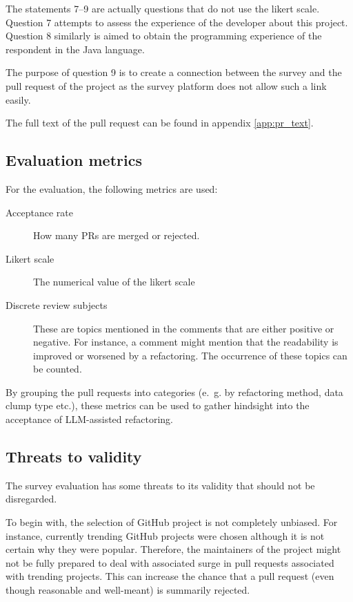 The statements 7--9 are actually questions that do not use the likert scale. Question 7 attempts to assess the experience of the developer about this project. Question 8 similarly is aimed to obtain the programming experience of the respondent in the Java language.

The purpose of question 9 is to create a connection between the survey and the pull request of the project as the survey platform does not allow such a link easily.

The full text of the pull request can be found in appendix \ref{app:pr_text}.


\subsection{Evaluation metrics}
For the evaluation, the following metrics are used:
\begin{description}
    \item [Acceptance rate] How many PRs are merged or rejected.
    \item [Likert scale] The numerical value of the likert scale
    \item[Discrete review subjects] These are topics mentioned in the comments that are either positive or negative. For instance, a comment might mention that the readability is improved or worsened by a refactoring. The occurrence of these topics can be counted. 
\end{description}

By grouping the pull requests into categories (e.~g. by refactoring method, data clump type etc.), these metrics can be used to gather hindsight into the acceptance of \ac{LLM}-assisted refactoring. 

\subsection{Threats to validity}

The survey evaluation has some threats to its validity that should not be disregarded.

To begin with, the selection of GitHub project is not completely unbiased. For instance, currently trending GitHub projects were chosen although it is not certain why they were popular. Therefore, the maintainers of the project might not be fully prepared to deal with associated surge in pull requests associated with trending projects. This can increase the chance that a pull request (even though reasonable and well-meant) is summarily rejected. \cite{10.1145/3366423.3380272}

